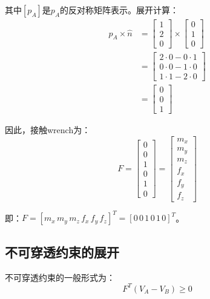 \documentclass[12pt,a4paper]{article}
\begin{document}
其中$[p_A]$是$p_A$的反对称矩阵表示。展开计算：
\begin{align}
p_A \times \hat{n} &= \begin{bmatrix} 1 \\ 2 \\ 0 \end{bmatrix} \times \begin{bmatrix} 0 \\ 1 \\ 0 \end{bmatrix} \\
&= \begin{bmatrix} 2 \cdot 0 - 0 \cdot 1 \\ 0 \cdot 0 - 1 \cdot 0 \\ 1 \cdot 1 - 2 \cdot 0 \end{bmatrix} \\
&= \begin{bmatrix} 0 \\ 0 \\ 1 \end{bmatrix}
\end{align}

因此，接触wrench为：
\begin{equation}
F = \begin{bmatrix} 0 \\ 0 \\ 1 \\ 0 \\ 1 \\ 0 \end{bmatrix} = \begin{bmatrix} m_x \\ m_y \\ m_z \\ f_x \\ f_y \\ f_z \end{bmatrix}
\end{equation}

即：$F = [m_x \, m_y \, m_z \, f_x \, f_y \, f_z]^T = [0 \, 0 \, 1 \, 0 \, 1 \, 0]^T$。

\subsection{不可穿透约束的展开}

不可穿透约束的一般形式为：
\begin{equation}
F^T (V_A - V_B) \geq 0
\label{eq:impenetrability_general}
\end{equation}
\end{document}

